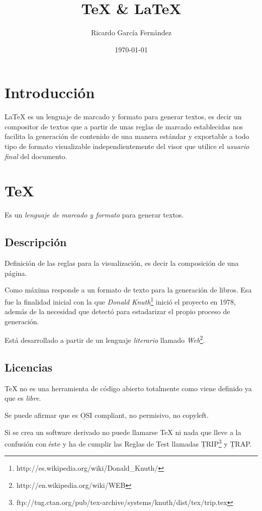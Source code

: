 \documentclass[11pt]{article}
\title{\textbf{\TeX{} \& \LaTeX{}}}
\author{Ricardo Garc\'ia Fern\'andez}
\date{\today}
\begin{document}
\maketitle

\section{Introducci\'on}

\LaTeX{} es un lenguaje de marcado y formato para generar textos, es decir un compositor de textos que a partir de unas reglas de marcado establecidas nos facilita la generaci\'on de contenido de una manera est\'andar y exportable a todo tipo de formato visualizable independientemente del visor que utilice el  \emph{usuario final} del documento.

\section{\TeX{}}

Es un \emph{lenguaje de marcado y formato} para generar textos.

\subsection{Descripci\'on}

Definici\'on de las reglas para la visualizaci\'on, es decir la composici\'on de una p\'agina.

Como m\'axima responde a un formato de texto para la generaci\'on de libros. Esa fue la finalidad inicial con la que \emph{Donald Knuth}\footnote{http://es.wikipedia.org/wiki/Donald\_Knuth/} inici\'o el proyecto en 1978, además de la necesidad que detectó para estadarizar el propio proceso de  generaci\'on.

Est\'a desarrollado a partir de un lenguaje \emph{literario} llamado \emph{Web}\footnote{http://en.wikipedia.org/wiki/WEB}.

\subsection{Licencias}

\TeX{} no es una herramienta de c\'odigo abierto totalmente como viene definido ya que es \emph{libre}.

Se puede afirmar que es \b{OSI compliant}, no permisivo, no copyleft.

Si se crea un software derivado no puede llamarse \TeX{} ni nada que lleve a la confusi\'on con \'este y ha de cumplir las Reglas de Test llamadas \b{TRIP}\footnote{ftp://tug.ctan.org/pub/tex-archive/systems/knuth/dist/tex/trip.tex} y \b{TRAP}.
\end{document}
